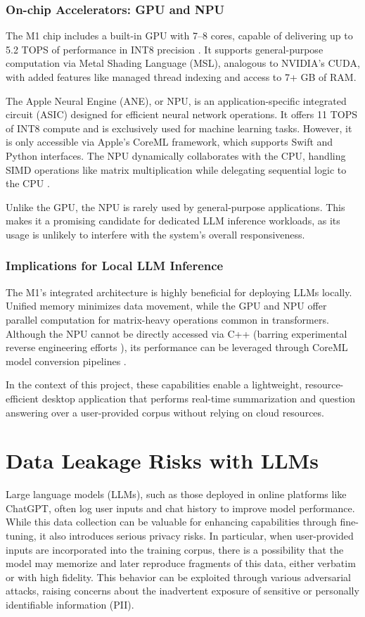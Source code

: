 \subsubsection*{On-chip Accelerators: GPU and NPU}
The M1 chip includes a built-in GPU with 7--8 cores, capable of delivering up to 5.2 TOPS of performance in INT8 precision \cite{apple2020metal}. It supports general-purpose computation via Metal Shading Language (MSL), analogous to NVIDIA's CUDA, with added features like managed thread indexing and access to 7+ GB of RAM.

The Apple Neural Engine (ANE), or NPU, is an application-specific integrated circuit (ASIC) designed for efficient neural network operations. It offers 11 TOPS of INT8 compute and is exclusively used for machine learning tasks. However, it is only accessible via Apple’s CoreML framework, which supports Swift and Python interfaces. The NPU dynamically collaborates with the CPU, handling SIMD operations like matrix multiplication while delegating sequential logic to the CPU \cite{tinygrad2023apple}.

Unlike the GPU, the NPU is rarely used by general-purpose applications. This makes it a promising candidate for dedicated LLM inference workloads, as its usage is unlikely to interfere with the system's overall responsiveness.

\subsubsection*{Implications for Local LLM Inference}
The M1's integrated architecture is highly beneficial for deploying LLMs locally. Unified memory minimizes data movement, while the GPU and NPU offer parallel computation for matrix-heavy operations common in transformers. Although the NPU cannot be directly accessed via C++ (barring experimental reverse engineering efforts \cite{tinygrad2023apple}), its performance can be leveraged through CoreML model conversion pipelines \cite{apple2024coremlconvert}.

In the context of this project, these capabilities enable a lightweight, resource-efficient desktop application that performs real-time summarization and question answering over a user-provided corpus without relying on cloud resources.

\section*{Data Leakage Risks with LLMs}
\label{sec:RisksWithLLMs}
Large language models (LLMs), such as those deployed in online platforms like ChatGPT, often log user inputs and chat history to improve model performance. While this data collection can be valuable for enhancing capabilities through fine-tuning, it also introduces serious privacy risks. In particular, when user-provided inputs are incorporated into the training corpus, there is a possibility that the model may memorize and later reproduce fragments of this data, either verbatim or with high fidelity. This behavior can be exploited through various adversarial attacks, raising concerns about the inadvertent exposure of sensitive or personally identifiable information (PII).

